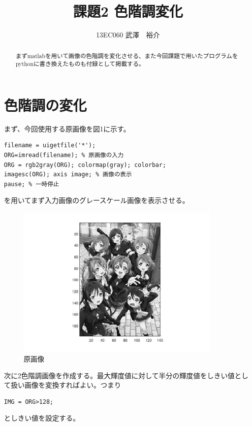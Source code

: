 \documentclass{jsarticle}
\begin{document}
\title{課題2 色階調変化}
\author{13EC060 武澤　裕介}
\maketitle
\begin{abstract}
まずmatlabを用いて画像の色階調を変化させる、また今回課題で用いたプログラムをpythonに書き換えたものも付録として掲載する。
\end{abstract}
\section{色階調の変化}
まず、今回使用する原画像を図1に示す。
\begin{lstlisting}[basicstyle=\ttfamily\footnotesize, frame=single]
filename = uigetfile('*');
ORG=imread(filename); % 原画像の入力
ORG = rgb2gray(ORG); colormap(gray); colorbar;
imagesc(ORG); axis image; % 画像の表示
pause; % 一時停止
 \end{lstlisting}
を用いてまず入力画像のグレースケール画像を表示させる。

\begin{figure}[htbp]
 \begin{center}
  \includegraphics[width=10cm]{kadai2-0.jpg}
 \end{center}
 \caption{原画像}
\end{figure}

次に2色階調画像を作成する。最大輝度値に対して半分の輝度値をしきい値として扱い画像を変換すればよい。つまり
\begin{lstlisting}[basicstyle=\ttfamily\footnotesize, frame=single]
IMG = ORG>128;
 \end{lstlisting}
としきい値を設定する。
\end{document}
